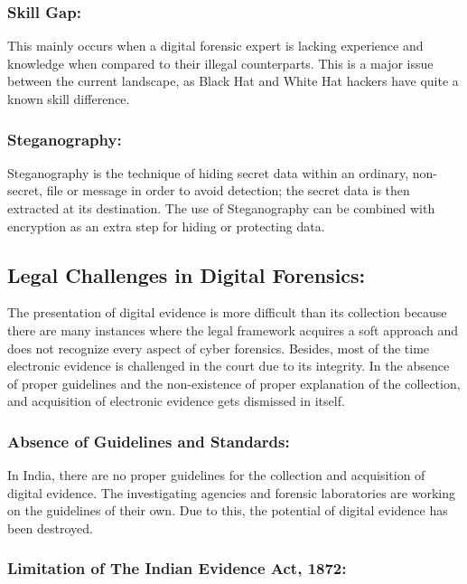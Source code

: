 \documentclass[british]{article}
\begin{document}
\subsubsection{Skill Gap:}

This mainly occurs when a digital forensic expert is lacking experience
and knowledge when compared to their illegal counterparts. This is
a major issue between the current landscape, as Black Hat and White
Hat hackers have quite a known skill difference.

\subsubsection{Steganography:}

Steganography is the technique of hiding secret data within an ordinary,
non-secret, file or message in order to avoid detection; the secret
data is then extracted at its destination. The use of Steganography
can be combined with encryption as an extra step for hiding or protecting
data.

\subsection{Legal Challenges in Digital Forensics:}

The presentation of digital evidence is more difficult than its collection
because there are many instances where the legal framework acquires
a soft approach and does not recognize every aspect of cyber forensics.
Besides, most of the time electronic evidence is challenged in the
court due to its integrity. In the absence of proper guidelines and
the non-existence of proper explanation of the collection, and acquisition
of electronic evidence gets dismissed in itself.

\subsubsection{Absence of Guidelines and Standards:}

In India, there are no proper guidelines for the collection and acquisition
of digital evidence. The investigating agencies and forensic laboratories
are working on the guidelines of their own. Due to this, the potential
of digital evidence has been destroyed.

\subsubsection{Limitation of The Indian Evidence Act, 1872:}
\end{document}

